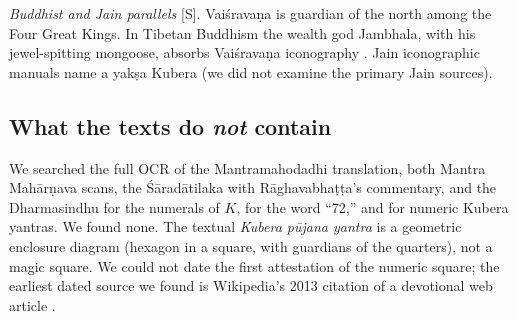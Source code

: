 \documentclass[pdflatex,sn-basic]{sn-jnl}
\theoremstyle{thmstyleone}
\theoremstyle{thmstylethree}
\newcommand{\Schol}{\textsf{[S]}}
\begin{document}
\emph{Buddhist and Jain parallels} \Schol. Vai\'srava\d na is guardian of the north among the Four Great Kings. In Tibetan Buddhism the wealth god Jambhala, with his jewel-spitting mongoose, absorbs Vai\'srava\d na iconography \citep{getty1914,sutherland1991}. Jain iconographic manuals name a yak\d sa Kubera (we did not examine the primary Jain sources).

\subsection{What the texts do \emph{not} contain}
We searched the full OCR of the Mantramahodadhi translation, both Mantra Mah\=ar\d nava scans, the \'S\=arad\=atilaka with R\=aghavabha\d t\d ta's commentary, and the Dharmasindhu for the numerals of $K$, for the word ``72,'' and for numeric Kubera yantras. We found none. The textual \emph{Kubera p\=ujana yantra} is a geometric enclosure diagram (hexagon in a square, with guardians of the quarters), not a magic square. We could not date the first attestation of the numeric square; the earliest dated source we found is Wikipedia's 2013 citation of a devotional web article \citep{wiki_kuberakolam}.
\end{document}
